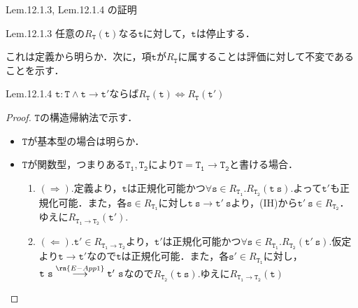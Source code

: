 \documentclass[9pt]{beamer}
\begin{document}
\begin{frame}{Lem.12.1.3, Lem.12.1.4 の証明}
\begin{alertblock}{Lem.12.1.3}
任意の$R_{\mathtt{T}}(\mathtt{t})$なる$\mathtt{t}$に対して，$\mathtt{t}$は停止する．
\end{alertblock}これは定義から明らか．次に，項$\mathtt{t}$が$R_{\mathtt{T}}$に属することは評価に対して不変であることを示す．
\begin{alertblock}{Lem.12.1.4}
$\mathtt{t:T}\land \mathtt{t\to t'}$ならば$R_{\mathtt{T}}(\mathtt{t})\Leftrightarrow R_{\mathtt{T}}(\mathtt{t'})$
\end{alertblock}
\begin{proof}
$\mathtt{T}$の構造帰納法で示す．\begin{itemize}\item $\mathtt{T}$が基本型の場合は明らか．
\item $\mathtt{T}$が関数型，つまりある$\mathtt{T_{1}, T_{2}}$により$\mathtt{T = T_{1}\to T_{2}}$と書ける場合．\begin{enumerate}
\item $(\Rightarrow)$.定義より，$\mathtt{t}$は正規化可能かつ$\forall \mathtt{s}\in R_{\mathtt{T_{1}}}.R_{\mathtt{T_{2}}}(\mathtt{t\ s})$.よって$\mathtt{t'}$も正規化可能．また，各$\mathtt{s}\in R_{\mathtt{T_{1}}}$に対し$\mathtt{t\ s}\longrightarrow\mathtt{t'\ s}$より，(IH)から$\mathtt{t'\ s}\in R_{\mathtt{T_{2}}}$．ゆえに$R_{{\mathtt{T_{1}\to T_{2}}}}(\mathtt{t'})$.
\item $(\Leftarrow)$.$\mathtt{t'}\in R_{{\mathtt{T_{1}\to T_{2}}}}$より，$\mathtt{t'}$は正規化可能かつ$\forall \mathtt{s}\in R_{\mathtt{T_{1}}}.R_{\mathtt{T_{2}}}(\mathtt{t'\ s})$.仮定より$\mathtt{t\longrightarrow t'}$なので$\mathtt{t}$は正規化可能．また，各$\mathtt{s'}\in R_{\mathtt{T_{1}}}$に対し，$\mathtt{t\ s}\stackrel{\rn{E-App1}}{\longrightarrow}\mathtt{t'\ s}$なので$R_{\mathtt{T_{2}}}(\mathtt{t\ s})$.ゆえに$R_{\mathtt{T_{1}\to T_{2}}}(\mathtt{t})$
\end{enumerate}
\end{itemize}
\end{proof}
\end{frame}
\end{document}
